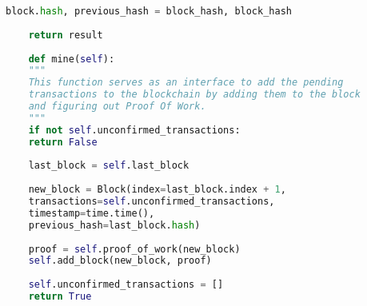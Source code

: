 \documentclass{article}
\begin{document}
\begin{lstlisting}[language=Python]
	block.hash, previous_hash = block_hash, block_hash
	
	return result
	
	def mine(self):
	"""
	This function serves as an interface to add the pending
	transactions to the blockchain by adding them to the block
	and figuring out Proof Of Work.
	"""
	if not self.unconfirmed_transactions:
	return False
	
	last_block = self.last_block
	
	new_block = Block(index=last_block.index + 1,
	transactions=self.unconfirmed_transactions,
	timestamp=time.time(),
	previous_hash=last_block.hash)
	
	proof = self.proof_of_work(new_block)
	self.add_block(new_block, proof)
	
	self.unconfirmed_transactions = []
	return True
\end{lstlisting}
	
\end{document}
